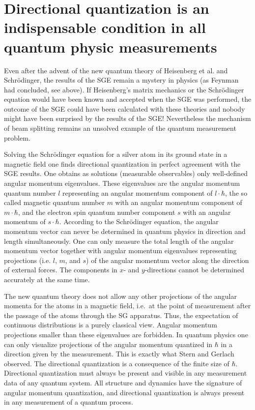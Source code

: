\documentclass[12pt]{article}
\begin{document}
\section{Directional quantization is an indispensable condition in all quantum physic measurements}

Even after the advent of the new quantum theory of Heisenberg et al. and Schrödinger, 
the results of the SGE remain a mystery in physics (as Feynman had concluded, see above). If Heisenberg's matrix mechanics or the Schrödinger equation would have been known and accepted when the SGE was performed, the outcome of the SGE could have been calculated with these theories and nobody might have been surprised by the results of the SGE! Nevertheless the mechanism of beam splitting remains an unsolved example of the quantum measurement problem. 

Solving the Schrödinger equation for a silver atom in its ground state in a magnetic field one finds directional quantization in perfect agreement with the SGE results. One obtains as solutions (measurable observables) only well-defined angular momentum eigenvalues. These eigenvalues are the angular momentum quantum number $l$ representing an angular momentum component of $l\cdot\hbar$, the so called magnetic quantum number $m$ with an angular momentum component of $m\cdot\hbar$, and the electron spin quantum number component $s$ with an angular momentum of $s\cdot\hbar$. According to the Schrödinger equation, the angular momentum vector can never be determined in quantum physics in direction and length simultaneously. One can only measure the total length of the angular momentum vector together with angular momentum eigenvalues representing projections (i.e. $l$, $m$, and $s$) of the angular momentum vector along the direction of external forces. The components in $x$- and $y$-directions cannot be determined accurately at the same time. 

The new quantum theory does not allow any other projections of the angular momenta for the atoms in a magnetic field, i.e.\ at the point of measurement after the passage of the atoms through the SG apparatus. Thus, the expectation of continuous distributions is a purely classical view. Angular momentum projections smaller than these eigenvalues are forbidden. In quantum physics one can only visualize projections of the angular momentum quantized in $\hbar$ in a direction given by the measurement. This is exactly what Stern and Gerlach observed. The directional quantization is a consequence of the finite size of $\hbar$. Directional quantization must always be present and visible in any measurement data of any quantum system. All structure and dynamics have the signature of angular momentum quantization, and directional quantization is always present in any measurement of a quantum process. 
\end{document}
